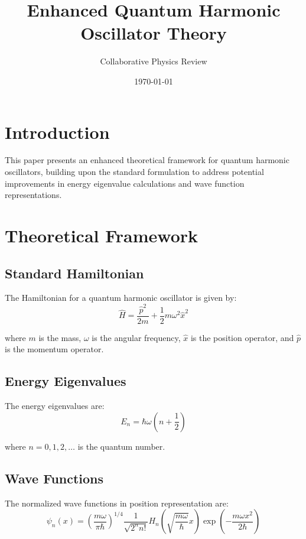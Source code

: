 \documentclass{article}
\title{Enhanced Quantum Harmonic Oscillator Theory}
\author{Collaborative Physics Review}
\date{\today}
\begin{document}
\maketitle

\section{Introduction}
This paper presents an enhanced theoretical framework for quantum harmonic oscillators, building upon the standard formulation to address potential improvements in energy eigenvalue calculations and wave function representations.

\section{Theoretical Framework}

\subsection{Standard Hamiltonian}
The Hamiltonian for a quantum harmonic oscillator is given by:
\begin{equation}
\hat{H} = \frac{\hat{p}^2}{2m} + \frac{1}{2}m\omega^2\hat{x}^2
\end{equation}

where $m$ is the mass, $\omega$ is the angular frequency, $\hat{x}$ is the position operator, and $\hat{p}$ is the momentum operator.

\subsection{Energy Eigenvalues}
The energy eigenvalues are:
\begin{equation}
E_n = \hbar\omega\left(n + \frac{1}{2}\right)
\end{equation}

where $n = 0, 1, 2, \ldots$ is the quantum number.

\subsection{Wave Functions}
The normalized wave functions in position representation are:
\begin{equation}
\psi_n(x) = \left(\frac{m\omega}{\pi\hbar}\right)^{1/4} \frac{1}{\sqrt{2^n n!}} H_n\left(\sqrt{\frac{m\omega}{\hbar}}x\right) \exp\left(-\frac{m\omega x^2}{2\hbar}\right)
\end{equation}
\end{document}
